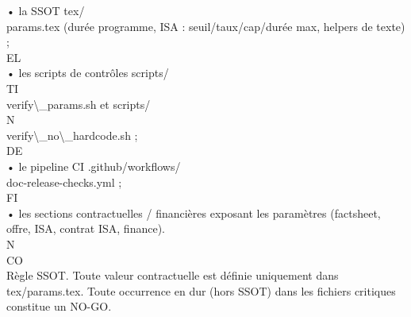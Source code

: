 \vspace{0.5em}
• la SSOT tex/\\
\vspace{0.5em}
params.tex (durée programme, ISA : seuil/taux/cap/durée max, helpers de texte) ;\\
\vspace{0.5em}
\vspace{0.5em}
\vspace{0.5em}
\vspace{0.5em}
EL\\
• les scripts de contrôles scripts/\\
\vspace{0.5em}
\vspace{0.5em}
\vspace{0.5em}
\vspace{0.5em}
TI\\
verify\textbackslash{}_params.sh et scripts/\\
\vspace{0.5em}
\vspace{0.5em}
\vspace{0.5em}
\vspace{0.5em}
N\\
verify\textbackslash{}_no\textbackslash{}_hardcode.sh ;\\
\vspace{0.5em}
\vspace{0.5em}
\vspace{0.5em}
\vspace{0.5em}
DE\\
• le pipeline CI .github/workflows/\\
\vspace{0.5em}
doc-release-checks.yml ;\\
\vspace{0.5em}
\vspace{0.5em}
\vspace{0.5em}
\vspace{0.5em}
FI\\
• les sections contractuelles / financières exposant les paramètres (factsheet, offre, ISA, contrat ISA, finance).\\
\vspace{0.5em}
\vspace{0.5em}
\vspace{0.5em}
N\\
CO\\
Règle SSOT. Toute valeur contractuelle est définie uniquement dans tex/params.tex. Toute occurrence en dur (hors SSOT) dans les fichiers critiques constitue un NO-GO.\\
